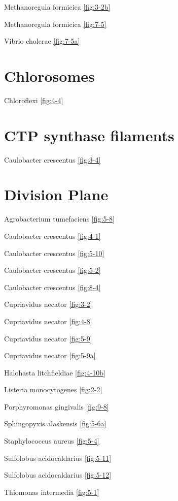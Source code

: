 \documentclass[]{tufte-book}
\begin{document}
Methanoregula formicica \ref{fig:3-2b}

Methanoregula formicica \ref{fig:7-5}

Vibrio cholerae \ref{fig:7-5a}

\section*{Chlorosomes}\label{chlorosomes}

Chloroflexi \ref{fig:4-4}

\section*{CTP synthase filaments}\label{ctp-synthase-filaments}

Caulobacter crescentus \ref{fig:3-4}

\section*{Division Plane}\label{division-plane}

Agrobacterium tumefaciens \ref{fig:5-8}

Caulobacter crescentus \ref{fig:4-1}

Caulobacter crescentus \ref{fig:5-10}

Caulobacter crescentus \ref{fig:5-2}

Caulobacter crescentus \ref{fig:8-4}

Cupriavidus necator \ref{fig:3-2}

Cupriavidus necator \ref{fig:4-8}

Cupriavidus necator \ref{fig:5-9}

Cupriavidus necator \ref{fig:5-9a}

Halohasta litchfieldiae \ref{fig:4-10b}

Listeria monocytogenes \ref{fig:2-2}

Porphyromonas gingivalis \ref{fig:9-8}

Sphingopyxis alaskensis \ref{fig:5-6a}

Staphylococcus aureus \ref{fig:5-4}

Sulfolobus acidocaldarius \ref{fig:5-11}

Sulfolobus acidocaldarius \ref{fig:5-12}

Thiomonas intermedia \ref{fig:5-1}
\end{document}
